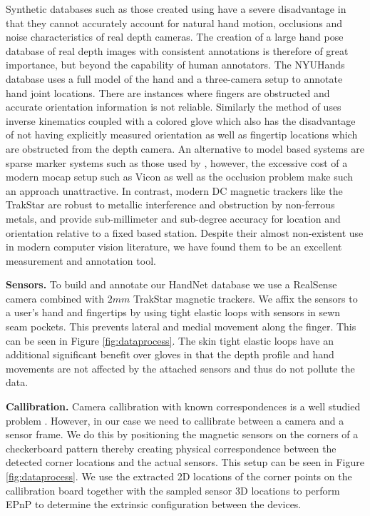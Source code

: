 \documentclass{bmvc2k}
\begin{document}
Synthetic databases such as those created using \cite{libhand} have a severe disadvantage in that they cannot accurately account for natural hand motion, occlusions and noise characteristics of real depth cameras. 
The creation of a large hand pose database of real depth images with consistent annotations 
is therefore of great importance, but beyond the capability of human annotators. The NYUHands database \cite{tompson14tog} uses a full model of the hand and a three-camera setup to annotate hand joint locations. 
There are instances where fingers are obstructed and accurate orientation information 
is not reliable. Similarly the method of \cite{Wang09} uses inverse kinematics coupled with a colored glove which also has the disadvantage of not having explicitly measured orientation as well 
as fingertip locations which are obstructed from the depth camera. An alternative to model based 
systems are sparse marker systems such as those used by 
\cite{ZhaoCX12}, however, the excessive cost of a modern mocap setup 
such as Vicon as well as the occlusion problem make such an approach unattractive. 
In contrast, modern DC magnetic trackers like the TrakStar \cite{trakstar} are robust to metallic 
interference and obstruction by non-ferrous metals, and provide sub-millimeter and sub-degree accuracy for location and orientation relative to a fixed based 
station. Despite their almost non-existent use in modern computer vision literature, we have found them to be an excellent measurement and annotation tool. 

\textbf{Sensors.} To build and annotate our HandNet database we use a RealSense camera combined with $2mm$ TrakStar magnetic trackers. We affix the sensors to a user's hand and fingertips 
by using tight elastic loops with sensors in sewn seam pockets. This 
prevents lateral and medial movement along the finger. This can be seen in Figure \ref{fig:dataprocess}.  
The skin tight elastic loops have an additional significant benefit over gloves in that the depth 
profile and hand movements are not affected by the attached sensors and thus do not 
pollute the data.

\textbf{Callibration.} Camera callibration with known correspondences is a well studied problem \cite{Zhang96}.
However, in our case we need to callibrate between a camera and a sensor frame.
We do this by positioning the magnetic sensors on the corners of a checkerboard 
pattern thereby creating physical correspondence between the detected corner locations and 
the actual sensors. This setup can be seen in Figure \ref{fig:dataprocess}. We use the extracted 
2D locations of the corner points on the callibration board \cite{bouguet2004camera} together with the sampled sensor 3D locations to perform  EPnP \cite{Epnp09} to determine the extrinsic configuration between the devices.
\end{document}
